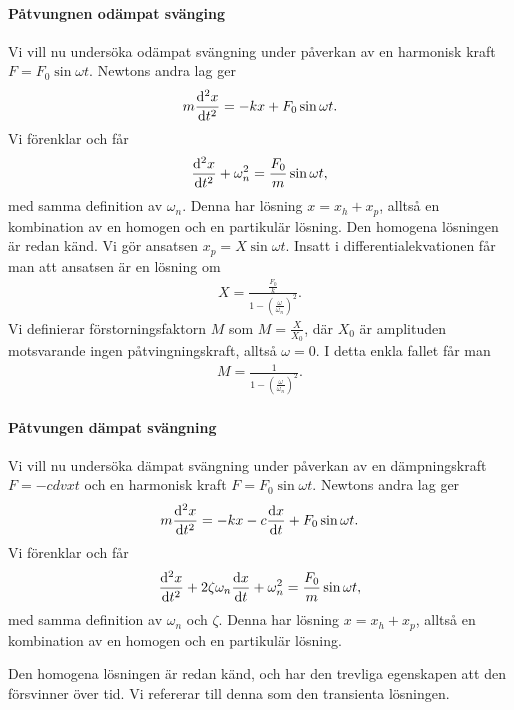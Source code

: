 \paragraph{Påtvungnen odämpat svänging}
Vi vill nu undersöka odämpat svängning under påverkan av en harmonisk kraft $F = F_0\sin{\omega t}$. Newtons andra lag ger
\begin{align}
	m\dv[2]{x}{t} = -kx + F_0\sin{\omega t}.
\end{align}
Vi förenklar och får
\begin{align*}
	\dv[2]{x}{t} + \omega_n^2 = \frac{F_0}{m}\sin{\omega t},
\end{align*}
med samma definition av $\omega_n$. Denna har lösning $x = x_h + x_p$, alltså en kombination av en homogen och en partikulär lösning. Den homogena lösningen är redan känd. Vi gör ansatsen $x_p = X\sin{\omega t}$. Insatt i differentialekvationen får man att ansatsen är en lösning om
\begin{align*}
	X = \frac{\frac{F_0}{k}}{1 - \left(\frac{\omega}{\omega_n}\right)^2}.
\end{align*}
Vi definierar förstorningsfaktorn $M$ som $M = \frac{X}{X_0}$, där $X_0$ är amplituden motsvarande ingen påtvingningskraft, alltså $\omega = 0$. I detta enkla fallet får man
\begin{align*}
	M = \frac{1}{1 - \left(\frac{\omega}{\omega_n}\right)^2}.
\end{align*}

\paragraph{Påtvungen dämpat svängning}
Vi vill nu undersöka dämpat svängning under påverkan av en dämpningskraft $F = -cdv{x}{t}$ och en harmonisk kraft $F = F_0\sin{\omega t}$. Newtons andra lag ger
\begin{align}
	m\dv[2]{x}{t} = -kx - c\dv{x}{t} + F_0\sin{\omega t}.
\end{align}
Vi förenklar och får
\begin{align*}
	\dv[2]{x}{t} + 2\zeta\omega_n\dv{x}{t} + \omega_n^2 = \frac{F_0}{m}\sin{\omega t},
\end{align*}
med samma definition av $\omega_n$ och $\zeta$. Denna har lösning $x = x_h + x_p$, alltså en kombination av en homogen och en partikulär lösning.

Den homogena lösningen är redan känd, och har den trevliga egenskapen att den försvinner över tid. Vi refererar till denna som den transienta lösningen.

